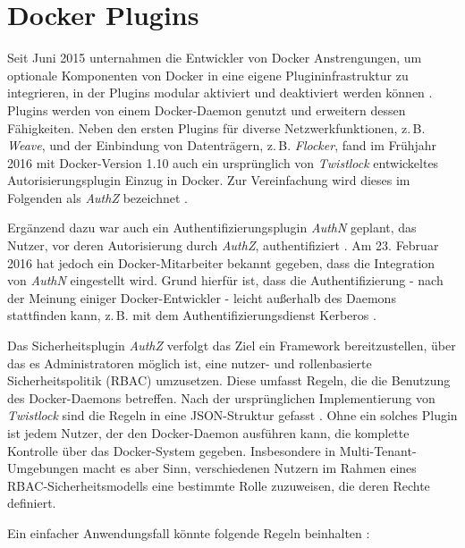 \documentclass[../main.tex]{subfiles}
\begin{document}
  \section{Docker Plugins}
  \label{plugins}
    Seit Juni 2015 unternahmen die Entwickler von Docker Anstrengungen, um optionale Komponenten von Docker in eine eigene Plugininfrastruktur zu integrieren, in der Plugins modular aktiviert und deaktiviert werden können \cite{githubDockerChangelog}\cite{dockerPlugins}. Plugins werden von einem Docker-Daemon genutzt und erweitern dessen Fähigkeiten. Neben den ersten Plugins für diverse Netzwerkfunktionen, z.\,B. \emph{Weave}, und der Einbindung von Datenträgern, z.\,B. \emph{Flocker}, fand im Frühjahr 2016 mit Docker-Version 1.10 auch ein ursprünglich von \emph{Twistlock}\cite{twistlock} entwickeltes Autorisierungsplugin Einzug in Docker. Zur Vereinfachung wird dieses im Folgenden als \emph{AuthZ} bezeichnet \cite{githubPluginList}\cite{dockerPlugins}\cite{authzTwistlock}.

    Ergänzend dazu war auch ein Authentifizierungsplugin \emph{AuthN} geplant, das Nutzer, vor deren Autorisierung durch \emph{AuthZ}, authentifiziert \cite{githubAuthZDockerAccessControl}. Am 23. Februar 2016 hat jedoch ein Docker-Mitarbeiter bekannt gegeben, dass die Integration von \emph{AuthN} eingestellt wird. Grund hierfür ist, dass die Authentifizierung - nach der Meinung einiger Docker-Entwickler - leicht außerhalb des Daemons stattfinden kann, z.\,B. mit dem Authentifizierungsdienst Kerberos \cite{kerberos}\cite{githubAuthZKerberosSupport}\cite{githubAuthNLaydown}.

    Das Sicherheitsplugin \emph{AuthZ} verfolgt das Ziel ein Framework bereitzustellen, über das es Administratoren möglich ist, eine nutzer- und rollenbasierte Sicherheitspolitik (\acrshort{RBAC}) umzusetzen. Diese umfasst Regeln, die die Benutzung des Docker-Daemons betreffen. Nach der ursprünglichen Implementierung von \emph{Twistlock} sind die Regeln in eine JSON-Struktur gefasst \cite{githubAuthZJSON}. Ohne ein solches Plugin ist jedem Nutzer, der den Docker-Daemon ausführen kann, die komplette Kontrolle über das Docker-System gegeben. Insbesondere in Multi-Tenant-Umgebungen macht es aber Sinn, verschiedenen Nutzern im Rahmen eines RBAC-Sicherheitsmodells eine bestimmte Rolle zuzuweisen, die deren Rechte definiert.

    \clearpage

    Ein einfacher Anwendungsfall könnte folgende Regeln beinhalten \cite{authzTwistlock}:
\end{document}
